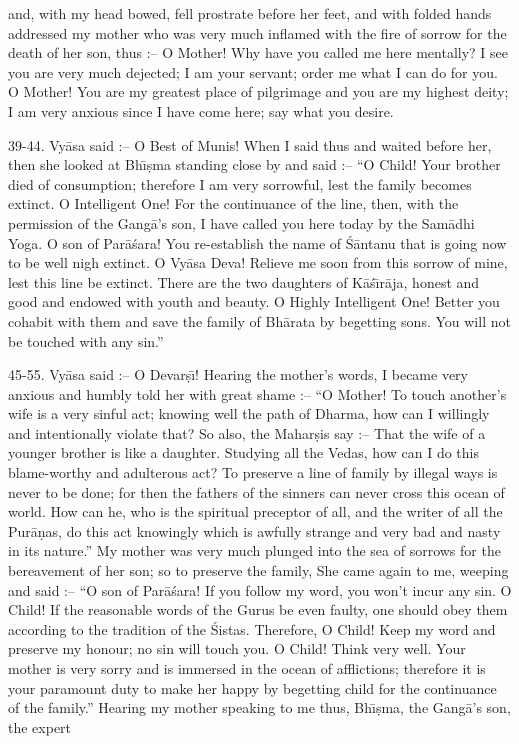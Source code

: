 and, with my head bowed, fell prostrate before her feet, and with folded hands addressed my mother who was very much inflamed with the fire of sorrow for the death of her son, thus :-- O Mother! Why have you called me here mentally? I see you are very much dejected; I am your servant; order me what I can do for you. O Mother! You are my greatest place of pilgrimage and you are my highest deity; I am very anxious since I have come here; say what you desire.

39-44. Vy\=asa said :-- O Best of Munis! When I said thus and waited before her, then she looked at Bh\={\i}\d{s}ma standing close by and said :-- ``O Child! Your brother died of consumption; therefore I am very sorrowful, lest the family becomes extinct. O Intelligent One! For the continuance of the line, then, with the permission of the Gang\=a's son, I have called you here today by the Sam\=adhi Yoga. O son of Par\=a\'sara! You re-establish the name of \'S\=antanu that is going now to be well nigh extinct. O Vy\=asa Deva! Relieve me soon from this sorrow of mine, lest this line be extinct. There are the two daughters of K\=a\'s\={\i}r\=aja, honest and good and endowed with youth and beauty. O Highly Intelligent One! Better you cohabit with them and save the family of Bh\=arata by begetting sons. You will not be touched with any sin.''

45-55. Vy\=asa said :-- O Devar\d{s}\={\i}! Hearing the mother's words, I became very anxious and humbly told her with great shame :-- ``O Mother! To touch another's wife is a very sinful act; knowing well the path of Dharma, how can I willingly and intentionally violate that? So also, the Mahar\d{s}is say :-- That the wife of a younger brother is like a daughter. Studying all the Vedas, how can I do this blame-worthy and adulterous act? To preserve a line of family by illegal ways is never to be done; for then the fathers of the sinners can never cross this ocean of world. How can he, who is the spiritual preceptor of all, and the writer of all the Pur\=a\d{n}as, do this act knowingly which is awfully strange and very bad and nasty in its nature.'' My mother was very much plunged into the sea of sorrows for the bereavement of her son; so to preserve the family, She came again to me, weeping and said :-- ``O son of Par\=a\'sara! If you follow my word, you won't incur any sin. O Child! If the reasonable words of the Gurus be even faulty, one should obey them according to the tradition of the \'Sistas. Therefore, O Child! Keep my word and preserve my honour; no sin will touch you. O Child! Think very well. Your mother is very sorry and is immersed in the ocean of afflictions; therefore it is your paramount duty to make her happy by begetting child for the continuance of the family.'' Hearing my mother speaking to me thus, Bh\={\i}\d{s}ma, the Gang\=a's son, the expert

